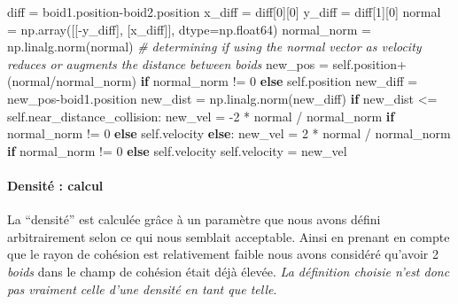 \documentclass[
]{article}
\newenvironment{Shaded}{}{}
\newcommand{\CommentTok}[1]{\textcolor[rgb]{0.38,0.63,0.69}{\textit{#1}}}
\newcommand{\ControlFlowTok}[1]{\textcolor[rgb]{0.00,0.44,0.13}{\textbf{#1}}}
\newcommand{\DecValTok}[1]{\textcolor[rgb]{0.25,0.63,0.44}{#1}}
\newcommand{\NormalTok}[1]{#1}
\newcommand{\OperatorTok}[1]{\textcolor[rgb]{0.40,0.40,0.40}{#1}}
\newcommand{\VariableTok}[1]{\textcolor[rgb]{0.10,0.09,0.49}{#1}}
\begin{document}
\begin{Shaded}
\begin{Highlighting}[]
\NormalTok{        diff }\OperatorTok{=}\NormalTok{ boid1.position}\OperatorTok{{-}}\NormalTok{boid2.position}
\NormalTok{        x\_diff }\OperatorTok{=}\NormalTok{ diff[}\DecValTok{0}\NormalTok{][}\DecValTok{0}\NormalTok{]}
\NormalTok{        y\_diff }\OperatorTok{=}\NormalTok{ diff[}\DecValTok{1}\NormalTok{][}\DecValTok{0}\NormalTok{]}
\NormalTok{        normal }\OperatorTok{=}\NormalTok{ np.array([[}\OperatorTok{{-}}\NormalTok{y\_diff], [x\_diff]], dtype}\OperatorTok{=}\NormalTok{np.float64)}
\NormalTok{        normal\_norm }\OperatorTok{=}\NormalTok{ np.linalg.norm(normal)}
        \CommentTok{\# determining if using the normal vector as velocity reduces or augments the distance between boids}
\NormalTok{        new\_pos }\OperatorTok{=} \VariableTok{self}\NormalTok{.position}\OperatorTok{+}\NormalTok{(normal}\OperatorTok{/}\NormalTok{normal\_norm) }\ControlFlowTok{if}\NormalTok{ normal\_norm }\OperatorTok{!=} \DecValTok{0} \ControlFlowTok{else} \VariableTok{self}\NormalTok{.position}
\NormalTok{        new\_diff }\OperatorTok{=}\NormalTok{ new\_pos}\OperatorTok{{-}}\NormalTok{boid1.position}
\NormalTok{        new\_dist }\OperatorTok{=}\NormalTok{ np.linalg.norm(new\_diff)}
        \ControlFlowTok{if}\NormalTok{ new\_dist }\OperatorTok{\textless{}=} \VariableTok{self}\NormalTok{.near\_distance\_collision:}
\NormalTok{            new\_vel }\OperatorTok{=} \OperatorTok{{-}}\DecValTok{2} \OperatorTok{*}\NormalTok{ normal }\OperatorTok{/}\NormalTok{ normal\_norm }\ControlFlowTok{if}\NormalTok{ normal\_norm }\OperatorTok{!=} \DecValTok{0} \ControlFlowTok{else} \VariableTok{self}\NormalTok{.velocity}
        \ControlFlowTok{else}\NormalTok{:}
\NormalTok{            new\_vel }\OperatorTok{=} \DecValTok{2} \OperatorTok{*}\NormalTok{ normal }\OperatorTok{/}\NormalTok{ normal\_norm }\ControlFlowTok{if}\NormalTok{ normal\_norm }\OperatorTok{!=} \DecValTok{0} \ControlFlowTok{else} \VariableTok{self}\NormalTok{.velocity}
        \VariableTok{self}\NormalTok{.velocity }\OperatorTok{=}\NormalTok{ new\_vel}
\end{Highlighting}
\end{Shaded}

\hypertarget{densituxe9-calcul}{%
\paragraph{Densité : calcul}\label{densituxe9-calcul}}

La ``densité'' est calculée grâce à un paramètre que nous avons défini
arbitrairement selon ce qui nous semblait acceptable. Ainsi en prenant
en compte que le rayon de cohésion est relativement faible nous avons
considéré qu'avoir 2 \emph{boids} dans le champ de cohésion était déjà
élevée. \emph{La définition choisie n'est donc pas vraiment celle d'une
densité en tant que telle}.
\end{document}
